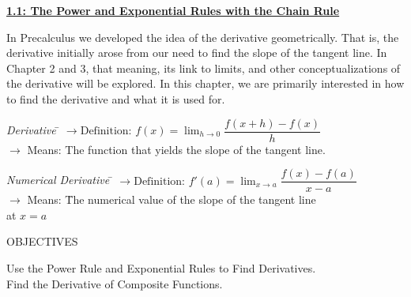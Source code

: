 \textbf{\underline{\large{1.1: The Power and Exponential Rules with the Chain Rule}}} \par

In Precalculus we developed the idea of the derivative geometrically. That is, the derivative initially arose from our need to find the slope of the tangent line. In Chapter 2 and 3, that meaning, its link to limits, and other conceptualizations of the derivative will be explored. In this chapter, we are primarily interested in how to find the derivative and what it is used for. \par

\begin{tcolorbox}[definition]
    \begin{tabbing}
        \textit{Derivative} \= $\rightarrow \text{Definition: } f(x) = \lim_{h \to 0} \dfrac{f(x + h) - f(x)}{h}$ \\[5.5pt]
        \> $\rightarrow$ {Means:  The function that yields the slope of the tangent line.}
\end{tabbing} \vspace{11pt}
\begin{tabbing}
    \textit{Numerical Derivative} \= $\rightarrow \text{Definition: } f'(a) = \lim_{x \to a} \dfrac{f(x) - f(a)}{x - a}$ \\[5.5pt]
    \> $\rightarrow$ Means: \= The numerical value of the slope of the tangent line \\
    \> \> at $x = a$ 
\end{tabbing}
\end{tcolorbox}

\begin{center}  
\end{center}

\begin{tcolorbox}[objective]
    \begin{center}
        OBJECTIVES \\[11pt]
    \end{center}
    Use the Power Rule and Exponential Rules to Find Derivatives. \\
    Find the Derivative of Composite Functions. 
\end{tcolorbox}



